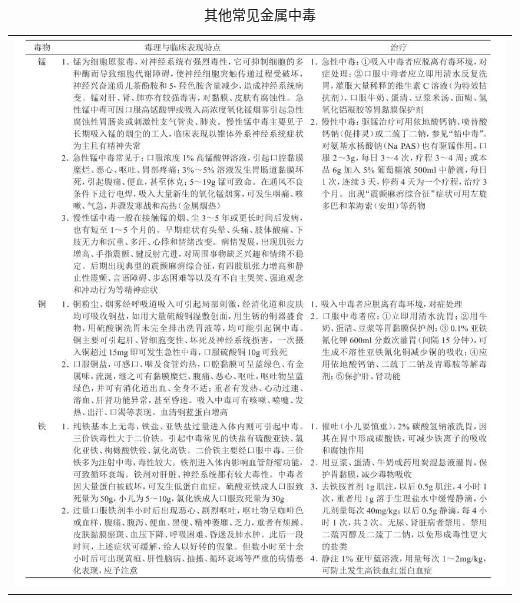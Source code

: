 \begin{longtable}{c}
 \caption{其他常见金属中毒}
 \label{tab58-1}
 \endfirsthead
 \caption[]{其他常见金属中毒}
 \endhead
 \includegraphics[width=\textwidth,height=\textheight,keepaspectratio]{./images/Image00219.jpg}\\

\end{longtable}
